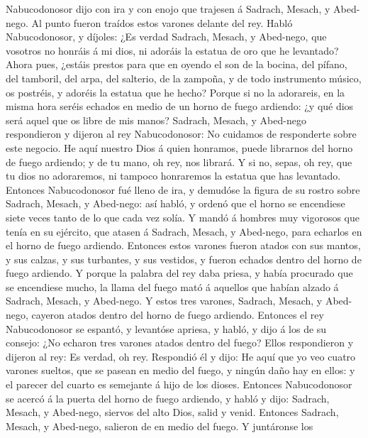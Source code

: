 Nabucodonosor dijo con ira y con enojo que trajesen á Sadrach, Mesach, y
Abed-nego. Al punto fueron traídos estos varones delante del rey.
 Habló Nabucodonosor, y díjoles: ¿Es verdad Sadrach,
Mesach, y Abed-nego, que vosotros no honráis á mi dios, ni adoráis la
estatua de oro que he levantado?  Ahora pues, ¿estáis
prestos para que en oyendo el son de la bocina, del pífano, del
tamboril, del arpa, del salterio, de la zampoña, y de todo instrumento
músico, os postréis, y adoréis la estatua que he hecho? Porque si no la
adorareis, en la misma hora seréis echados en medio de un horno de fuego
ardiendo: ¿y qué dios será aquel que os libre de mis manos?
 Sadrach, Mesach, y Abed-nego respondieron y dijeron al
rey Nabucodonosor: No cuidamos de responderte sobre este negocio.
 He aquí nuestro Dios á quien honramos, puede librarnos
del horno de fuego ardiendo; y de tu mano, oh rey, nos librará.
 Y si no, sepas, oh rey, que tu dios no adoraremos, ni
tampoco honraremos la estatua que has levantado. 
Entonces Nabucodonosor fué lleno de ira, y demudóse la figura de su
rostro sobre Sadrach, Mesach, y Abed-nego: así habló, y ordenó que el
horno se encendiese siete veces tanto de lo que cada vez solía.
 Y mandó á hombres muy vigorosos que tenía en su
ejército, que atasen á Sadrach, Mesach, y Abed-nego, para echarlos en el
horno de fuego ardiendo.  Entonces estos varones fueron
atados con sus mantos, y sus calzas, y sus turbantes, y sus vestidos, y
fueron echados dentro del horno de fuego ardiendo.  Y
porque la palabra del rey daba priesa, y había procurado que se
encendiese mucho, la llama del fuego mató á aquellos que habían alzado á
Sadrach, Mesach, y Abed-nego.  Y estos tres varones,
Sadrach, Mesach, y Abed-nego, cayeron atados dentro del horno de fuego
ardiendo.  Entonces el rey Nabucodonosor se espantó, y
levantóse apriesa, y habló, y dijo á los de su consejo: ¿No echaron tres
varones atados dentro del fuego? Ellos respondieron y dijeron al rey: Es
verdad, oh rey.  Respondió él y dijo: He aquí que yo veo
cuatro varones sueltos, que se pasean en medio del fuego, y ningún daño
hay en ellos: y el parecer del cuarto es semejante á hijo de los dioses.
 Entonces Nabucodonosor se acercó á la puerta del horno
de fuego ardiendo, y habló y dijo: Sadrach, Mesach, y Abed-nego, siervos
del alto Dios, salid y venid. Entonces Sadrach, Mesach, y Abed-nego,
salieron de en medio del fuego.  Y juntáronse los
